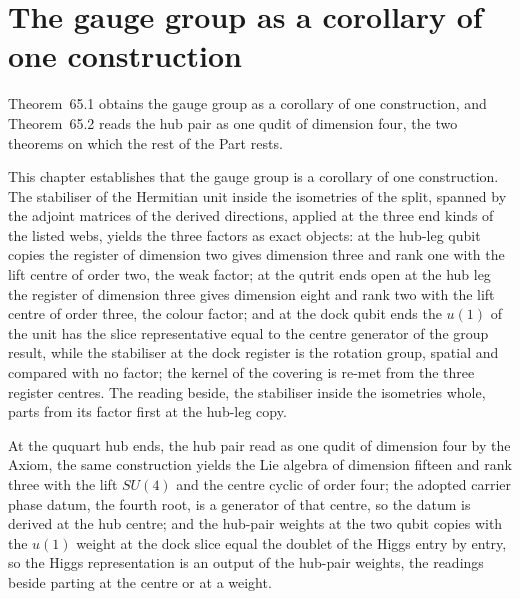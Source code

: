 \section{The gauge group as a corollary of one construction}\label{mod:IV-2-gauge-group-as-a-corollary-of-one-construction}
\label{narr:open:4-2}Theorem~65.1 obtains the gauge group as a corollary of one construction, and Theorem~65.2 reads the hub pair as one qudit of dimension four, the two theorems on which the rest of the Part rests.
\begin{chtheorem}\label{box:IV-2-gauge-group-as-a-corollary-of-one-construction:1}
This chapter establishes that the gauge group is a corollary of one construction. The stabiliser of the Hermitian unit inside the isometries of the split, spanned by the adjoint matrices of the derived directions, applied at the three end kinds of the listed webs, yields the three factors as exact objects: at the hub-leg qubit copies the register of dimension two gives dimension three and rank one with the lift centre of order two, the weak factor; at the qutrit ends open at the hub leg the register of dimension three gives dimension eight and rank two with the lift centre of order three, the colour factor; and at the dock qubit ends the $u(1)$ of the unit has the slice representative equal to the centre generator of the group result, while the stabiliser at the dock register is the rotation group, spatial and compared with no factor; the kernel of the covering is re-met from the three register centres. The reading beside, the stabiliser inside the isometries whole, parts from its factor first at the hub-leg copy.
\end{chtheorem}
\begin{chtheorem}\label{box:IV-2-gauge-group-as-a-corollary-of-one-construction:2}
At the ququart hub ends, the hub pair read as one qudit of dimension four by the Axiom, the same construction yields the Lie algebra of dimension fifteen and rank three with the lift $SU(4)$ and the centre cyclic of order four; the adopted carrier phase datum, the fourth root, is a generator of that centre, so the datum is derived at the hub centre; and the hub-pair weights at the two qubit copies with the $u(1)$ weight at the dock slice equal the doublet of the Higgs entry by entry, so the Higgs representation is an output of the hub-pair weights, the readings beside parting at the centre or at a weight.
\end{chtheorem}
